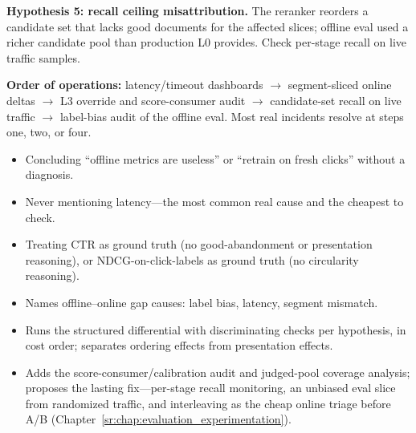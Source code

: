 \begin{interviewq}
\textbf{Hypothesis 5: recall ceiling misattribution.} The reranker reorders a candidate set that lacks good documents for the affected slices; offline eval used a richer candidate pool than production L0 provides. Check per-stage recall on live traffic samples.

\textbf{Order of operations:} latency/timeout dashboards $\to$ segment-sliced online deltas $\to$ L3 override and score-consumer audit $\to$ candidate-set recall on live traffic $\to$ label-bias audit of the offline eval. Most real incidents resolve at steps one, two, or four.

\redflags
\begin{itemize}
    \item Concluding ``offline metrics are useless'' or ``retrain on fresh clicks'' without a diagnosis.
    \item Never mentioning latency---the most common real cause and the cheapest to check.
    \item Treating CTR as ground truth (no good-abandonment or presentation reasoning), or NDCG-on-click-labels as ground truth (no circularity reasoning).
\end{itemize}


\goodgreat
\begin{itemize}
    \item {} Names offline--online gap causes: label bias, latency, segment mismatch.
    \item {} Runs the structured differential with discriminating checks per hypothesis, in cost order; separates ordering effects from presentation effects.
    \item {} Adds the score-consumer/calibration audit and judged-pool coverage analysis; proposes the lasting fix---per-stage recall monitoring, an unbiased eval slice from randomized traffic, and interleaving as the cheap online triage before A/B (Chapter~\ref{sr:chap:evaluation_experimentation}).
\end{itemize}

\end{interviewq}

